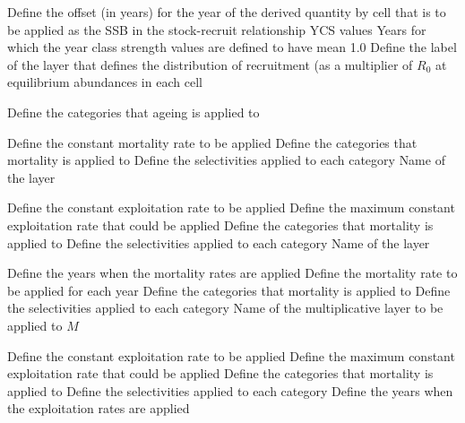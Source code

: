  {Define the offset (in years) for the year of the derived quantity by cell that is to be applied as the SSB in the stock-recruit relationship}
 {YCS values}
 {Years for which the year class strength values are defined to have mean 1.0}
 {Define the label of the layer that defines the distribution of recruitment (as a multiplier of $R_0$ at equilibrium abundances in each cell}
\par\textbf{}\par
{} {Define the categories that ageing is applied to}
\par\textbf{}\par
{} {Define the constant mortality rate to be applied}
 {Define the categories that mortality is applied to}
 {Define the selectivities applied to each category}
 {Name of the layer}
\par\textbf{}\par
{} {Define the constant exploitation rate to be applied}
 {Define the maximum constant exploitation rate that could be applied}
 {Define the categories that mortality is applied to}
 {Define the selectivities applied to each category}
 {Name of the layer}
\par\textbf{}\par
{} {Define the years when the mortality rates are applied}
 {Define the mortality rate to be applied for each year}
 {Define the categories that mortality is applied to}
 {Define the selectivities applied to each category}
 {Name of the multiplicative layer to be applied to $M$}
\par\textbf{}\par
{} {Define the constant exploitation rate to be applied}
 {Define the maximum constant exploitation rate that could be applied}
 {Define the categories that mortality is applied to}
 {Define the selectivities applied to each category}
 {Define the years when the exploitation rates are applied}
